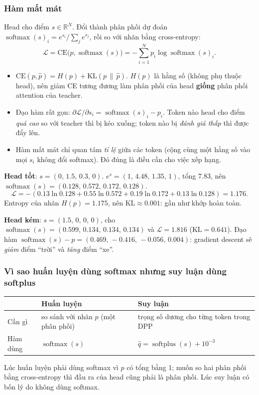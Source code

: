 \documentclass[11pt,a4paper]{article}
\newcommand{\qhat}{\hat{q}}
\newcommand{\R}{\mathbb{R}}
\newcommand{\softmax}{\operatorname{softmax}}
\newcommand{\softplus}{\operatorname{softplus}}
\begin{document}
\subsubsection*{Hàm mất mát}
Head cho điểm $s\in\R^N$. Đổi thành phân phối dự đoán $\softmax(s)_i=e^{s_i}/\sum_je^{s_j}$, rồi so với nhãn bằng cross-entropy:
\begin{equation}
\mathcal{L}=\mathrm{CE}\big(p,\softmax(s)\big)=-\sum_{i=1}^N p_i\log\softmax(s)_i.
\end{equation}

\begin{trucgiac}
\begin{itemize}
\item $\mathrm{CE}(p,\hat p)=H(p)+\mathrm{KL}(p\,\|\,\hat p)$. $H(p)$ là hằng số (không phụ thuộc head), nên giảm CE tương đương làm phân phối của head \textbf{giống} phân phối attention của teacher.
\item Đạo hàm rất gọn: $\partial\mathcal{L}/\partial s_i=\softmax(s)_i-p_i$. Token nào head cho điểm \emph{quá cao} so với teacher thì bị kéo xuống; token nào bị \emph{đánh giá thấp} thì được đẩy lên.
\item Hàm mất mát chỉ quan tâm \emph{tỉ lệ} giữa các token (cộng cùng một hằng số vào mọi $s_i$ không đổi softmax). Đó đúng là điều cần cho việc xếp hạng.
\end{itemize}
\end{trucgiac}

\begin{vidu}[: tính loss với $p=(0.13,\,0.55,\,0.19,\,0.13)$]
\textbf{Head tốt}: $s=(0,\,1.5,\,0.3,\,0)$. $e^{s}=(1,\,4.48,\,1.35,\,1)$, tổng $7.83$, nên $\softmax(s)=(0.128,\,0.572,\,0.172,\,0.128)$.
\[
\mathcal{L}=-(0.13\ln0.128+0.55\ln0.572+0.19\ln0.172+0.13\ln0.128)=1.176.
\]
Entropy của nhãn $H(p)=1.175$, nên $\mathrm{KL}\approx0.001$: gần như khớp hoàn toàn.

\textbf{Head kém}: $s=(1.5,\,0,\,0,\,0)$, cho $\softmax(s)=(0.599,\,0.134,\,0.134,\,0.134)$ và $\mathcal{L}=1.816$ ($\mathrm{KL}=0.641$).
Đạo hàm $\softmax(s)-p=(0.469,\,-0.416,\,-0.056,\,0.004)$: gradient descent sẽ \emph{giảm} điểm ``trời'' và \emph{tăng} điểm ``xe''.
\end{vidu}

\subsubsection*{Vì sao huấn luyện dùng softmax nhưng suy luận dùng softplus}
\label{sec:softplus}
\begin{center}
\begin{tabular}{@{}lll@{}}
\toprule
& Huấn luyện & Suy luận\\
\midrule
Cần gì & so sánh với nhãn $p$ (một phân phối) & trọng số dương cho từng token trong DPP\\
Hàm dùng & $\softmax(s)$ & $\qhat=\softplus(s)+10^{-3}$\\
\bottomrule
\end{tabular}
\end{center}
Lúc huấn luyện phải dùng softmax vì $p$ có tổng bằng 1; muốn so hai phân phối bằng cross-entropy thì đầu ra của head cũng phải là phân phối. Lúc suy luận có bốn lý do không dùng softmax.
\end{document}

